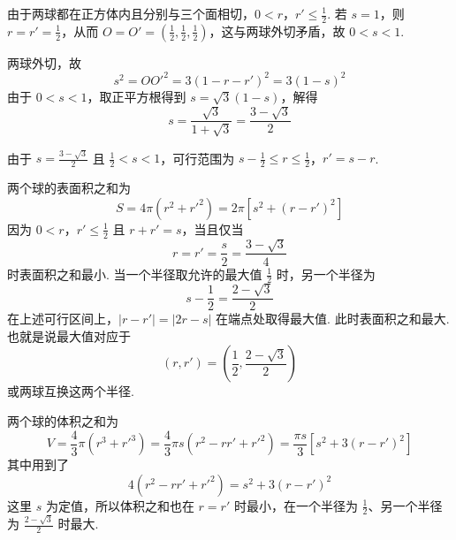 \begin{solution}
\begin{enumerate}
由于两球都在正方体内且分别与三个面相切，\(0<r\)，\(r'\le\frac12\). 若 \(s=1\)，则 \(r=r'=\frac12\)，从而 \(O=O'=\left(\frac12,\frac12,\frac12\right)\)，这与两球外切矛盾，故 \(0<s<1\).

两球外切，故
\[
s^2=OO'^2=3\left( 1-r-r' \right)^2=3\left( 1-s \right)^2
\]
由于 \(0<s<1\)，取正平方根得到 \(s=\sqrt3\left( 1-s \right)\)，解得
\[
s=\frac{\sqrt3}{1+\sqrt3}=\frac{3-\sqrt3}{2}
\]

由于 \(s=\frac{3-\sqrt3}{2}\) 且 \(\frac12<s<1\)，可行范围为
\(s-\frac12\le r\le\frac12\)，\(r'=s-r\).

两个球的表面积之和为
\[
S=4\pi\left( r^2+r'^2 \right)=2\pi\left[ s^2+\left( r-r' \right)^2 \right]
\]
因为 \(0<r\)，\(r'\le\frac12\) 且 \(r+r'=s\)，当且仅当
\[
r=r'=\frac{s}{2}=\frac{3-\sqrt3}{4}
\]
时表面积之和最小. 当一个半径取允许的最大值 \(\frac12\) 时，另一个半径为
\[
s-\frac12=\frac{2-\sqrt3}{2}
\]
在上述可行区间上，\(\lvert r-r'\rvert=\lvert 2r-s\rvert\) 在端点处取得最大值. 此时表面积之和最大. 也就是说最大值对应于
\[
\left( r,r' \right)=\left( \frac12,\frac{2-\sqrt3}{2} \right)
\]
或两球互换这两个半径.

两个球的体积之和为
\[
V=\frac43\pi\left( r^3+r'^3 \right)
=\frac43\pi s\left( r^2-rr'+r'^2 \right)
=\frac{\pi s}{3}\left[ s^2+3\left( r-r' \right)^2 \right]
\]
其中用到了
\[
4\left( r^2-rr'+r'^2 \right)=s^2+3\left( r-r' \right)^2
\]
这里 \(s\) 为定值，所以体积之和也在 \(r=r'\) 时最小，在一个半径为 \(\frac12\)、另一个半径为 \(\frac{2-\sqrt3}{2}\) 时最大.
\end{enumerate}
\end{solution}

